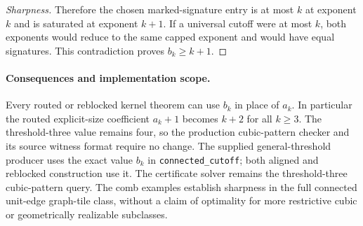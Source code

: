 \begin{proof}[Sharpness]
Therefore the chosen marked-signature entry is at most $k$ at exponent $k$
and is saturated at exponent $k+1$.  If a universal cutoff were at most $k$,
both exponents would reduce to the same capped exponent and would have equal
signatures.  This contradiction proves $b_k\geq k+1$.
\end{proof}

\paragraph{Consequences and implementation scope.}
Every routed or reblocked kernel theorem can use $b_k$ in place of $a_k$.
In particular the routed explicit-size coefficient $a_k+1$ becomes $k+2$
for all $k\geq3$.  The threshold-three value remains four, so the production
cubic-pattern checker and its source witness format require no change.
The supplied general-threshold producer uses the exact value $b_k$ in
\texttt{connected\_cutoff}; both aligned and reblocked construction use it.
The certificate solver remains the threshold-three cubic-pattern query.
The comb examples establish sharpness in the
full connected unit-edge graph-tile class, without a claim of optimality for
more restrictive cubic or geometrically realizable subclasses.
